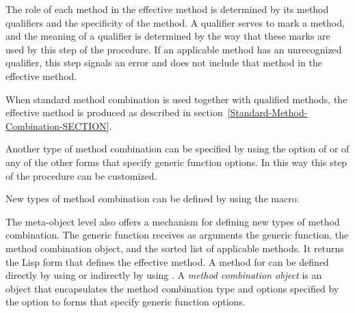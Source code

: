 The role of each method in the effective method is determined by its
method qualifiers and the specificity of the method.  A qualifier
serves to mark a method, and the meaning of a qualifier is
determined by the way that these marks are used by this step
of the procedure.  If an applicable method has an unrecognized
qualifier, this step signals an error and does not include that method
in the effective method.

When standard method combination is used together with qualified methods, 
the effective method is produced as described in
section~\ref{Standard-Method-Combination-SECTION}.

Another type of method combination can be specified by using the 
 option of  or of any of the other
forms that specify generic function options.  In this way this step of
the procedure can be customized.

New types of method combination can be defined by using the 
 macro. 


The meta-object level also offers a mechanism for defining new types
of method combination.  The generic function 
 receives as arguments the generic function,
the method combination object, and the sorted list of applicable
methods.  It returns the Lisp form that defines the effective method.
A method for  can be defined directly by
using  or indirectly by using 
.
A \emph{method combination object} is an
object that encapsulates the method combination type and options
specified by the  option to forms that
specify generic function options.



